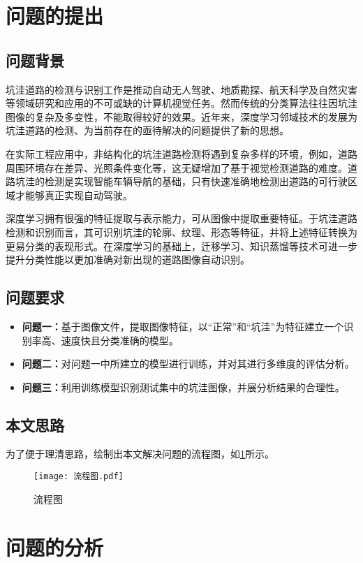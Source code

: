 \documentclass{MathorCupmodeling}
\begin{document}
	\pagestyle{empty}
	\tableofcontents
	\newpage
	\pagestyle{fancy}

	\setcounter{page}{1}
	\section{问题的提出}
	\subsection{问题背景}
	坑洼道路的检测与识别工作是推动自动无人驾驶、地质勘探、航天科学及自然灾害等领域研究和应用的不可或缺的计算机视觉任务。然而传统的分类算法往往因坑洼图像的复杂及多变性，不能取得较好的效果。近年来，深度学习邻域技术的发展为坑洼道路的检测、为当前存在的亟待解决的问题提供了新的思想。

	在实际工程应用中，非结构化的坑洼道路检测将遇到复杂多样的环境，例如，道路周围环境存在差异、光照条件变化等，这无疑增加了基于视觉检测道路的难度\textcolor{blue}{\cite{曹江华}}。道路坑洼的检测是实现智能车辆导航的基础，只有快速准确地检测出道路的可行驶区域才能够真正实现自动驾驶。

	深度学习拥有很强的特征提取与表示能力，可从图像中提取重要特征。于坑洼道路检测和识别而言，其可识别坑洼的轮廓、纹理、形态等特征，并将上述特征转换为更易分类的表现形式。在深度学习的基础上，迁移学习、知识蒸馏等技术可进一步提升分类性能以更加准确对新出现的道路图像自动识别。
	\subsection{问题要求}
	\begin{itemize}
		\item \textbf{问题一：}基于图像文件，提取图像特征，以“正常”和“坑洼”为特征建立一个识别率高、速度快且分类准确的模型。
		\item \textbf{问题二：}对问题一中所建立的模型进行训练，并对其进行多维度的评估分析。
		\item \textbf{问题三：}利用训练模型识别测试集中的坑洼图像，并展分析结果的合理性。
	\end{itemize}
	\subsection{本文思路}
	为了便于理清思路，绘制出本文解决问题的流程图，如\textcolor{blue}{\cref{fig:流程图}}所示。
	\begin{figure}[H]
		\centering
		\texttt{[image: 流程图.pdf]}
		\caption{流程图}
		\label{fig:流程图}
	\end{figure}
	\section{问题的分析}
\end{document}
